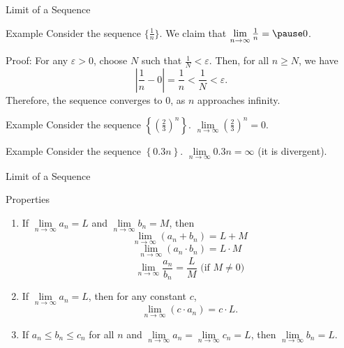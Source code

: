 \documentclass{beamer}
\begin{document}
\begin{frame}{Limit of a Sequence}
    \begin{exampleblock}{Example}
        Consider the sequence $\{ \frac{1}{n} \}$. We claim that $\lim\limits_{n \to \infty} \frac{1}{n} = \pause0$.

        \pause Proof: For any $\varepsilon > 0$, choose $N$ such that $\frac{1}{N} < \varepsilon$. Then, for all $n \geq N$, we have
        \[
        \left| \frac{1}{n} - 0 \right| = \frac{1}{n} < \frac{1}{N} < \varepsilon.
        \]
        Therefore, the sequence converges to $0$, as $n$ approaches infinity.
    \end{exampleblock}
\pause

    \begin{exampleblock}{Example}
        Consider the sequence $\left\{ (\frac{2}{3})^n \right\}$. $\lim\limits_{n \to \infty} (\frac{2}{3})^n  = 0$.

    \end{exampleblock}
    \pause

    \begin{exampleblock}{Example}
        Consider the sequence $\left\{ 0.3n \right\}$. $\lim\limits_{n \to \infty} 0.3n  = \infty$ (it is divergent).

    \end{exampleblock}

\end{frame}


\begin{frame}{Limit of a Sequence}

    \begin{block}{Properties}
\begin{enumerate}[<+->]
    \item        If $\lim\limits_{n \to \infty} a_n = L$ and $\lim\limits_{n \to \infty} b_n = M$, then
        \[
        \lim\limits_{n \to \infty} (a_n + b_n) = L + M
        \]
        \[
        \lim\limits_{n \to \infty} (a_n \cdot b_n) = L \cdot M
        \]
        \[
        \lim\limits_{n \to \infty} \frac{a_n}{b_n} = \frac{L}{M}  \text{ (if $M\ne0$)}
        \]
\item        If $\lim\limits_{n \to \infty} a_n = L$, then for any constant $c$, 
        \[
        \lim\limits_{n \to \infty} (c \cdot a_n) = c \cdot L.
        \]
\item        If $a_n \leq b_n \leq c_n$ for all $n$ and $\lim\limits_{n \to \infty} a_n = \lim\limits_{n \to \infty} c_n = L$, then $\lim\limits_{n \to \infty} b_n = L$.
\end{enumerate} 
\end{block}
\end{frame}
\end{document}
